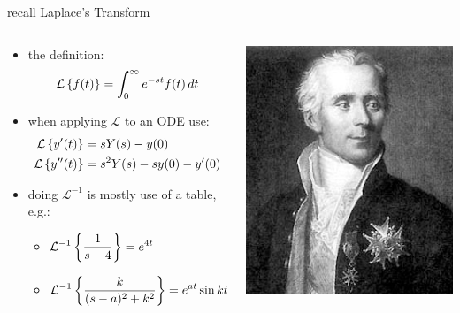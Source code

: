 \documentclass[urlcolor=blue,dvipsnames]{beamer}
\begin{document}
\begin{frame}{recall Laplace's Transform}

\begin{columns}
\begin{column}{0.77\textwidth}
\begin{itemize}
\item the definition:
    $$\mathcal{L}\left\{f(t)\right\} = \int_0^\infty e^{-st} f(t)\,dt$$
\item when applying $\mathcal{L}$ to an ODE use:
\begin{align*}
\mathcal{L}\left\{y'(t)\right\} &= s Y(s) - y(0) \\
\mathcal{L}\left\{y''(t)\right\} &= s^2 Y(s) - s y(0) - y'(0)
\end{align*}
\item doing $\mathcal{L}^{-1}$ is mostly use of a table, e.g.:
    \begin{itemize}
    \item $\displaystyle \mathcal{L}^{-1}\left\{\frac{1}{s-4}\right\} = e^{4t}$
    \item $\displaystyle \mathcal{L}^{-1}\left\{\frac{k}{(s-a)^2+k^2}\right\} = e^{at} \sin{kt}$
    \end{itemize}
\end{itemize}
\end{column}
\begin{column}{0.23\textwidth}
\includegraphics[width=\textwidth]{figs/Laplace-sharp}


\end{column}
\end{columns}
\end{frame}
\end{document}
